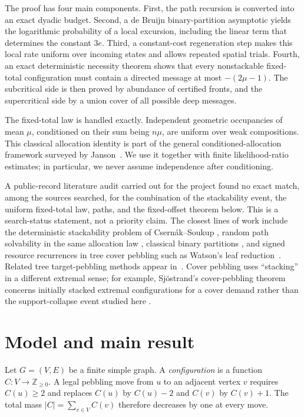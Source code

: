 \documentclass[11pt]{article}
\newcommand{\Z}{\mathbb Z}
\begin{document}
The proof has four main components.  First, the path recursion is converted
into an exact dyadic budget.  Second, a de Bruijn binary-partition asymptotic
\cite{deBruijn1948} yields the logarithmic probability of a local excursion,
including the linear term that determines the constant $3e$.  Third, a
constant-cost regeneration step makes this local rate uniform over incoming
states and allows repeated spatial trials.  Fourth, an exact deterministic
necessity theorem shows that every nonstackable fixed-total configuration must
contain a directed message at most $-(2\mu-1)$.  The subcritical side is then
proved by abundance of certified fronts, and the supercritical side by a union
cover of all possible deep messages.

The fixed-total law is handled exactly.  Independent geometric occupancies of
mean $\mu$, conditioned on their sum being $n\mu$, are uniform over weak
compositions.  This classical allocation identity is part of the general
conditioned-allocation framework surveyed by Janson~\cite{Janson2012}.  We use
it together with finite likelihood-ratio estimates; in particular, we never
assume independence after conditioning.

A public-record literature audit carried out for the project found no exact
match, among the sources searched, for the combination of the stackability
event, the uniform fixed-total law, paths, and the fixed-offset theorem below.
This is a search-status statement, not a priority claim.  The closest lines of
work include the deterministic stackability problem of Csern\'ak--Soukup
\cite{CsernakSoukup2026}, random path solvability in the same allocation law
\cite{Moews2019,BushawKettle2025}, classical binary partitions
\cite{Mahler1940,deBruijn1948}, and signed resource recurrences in tree cover
pebbling such as Watson's leaf reduction~\cite{Watson2005}.  Related tree
target-pebbling methods appear in~\cite{AdautoEtAl2026}.  Cover pebbling
uses ``stacking'' in a different extremal sense; for example, Sj\"ostrand's
cover-pebbling theorem concerns initially stacked extremal configurations for a
cover demand rather than the support-collapse event studied here
\cite{Sjoestrand2005}.

\section{Model and main result}\label{sec:model}

Let $G=(V,E)$ be a finite simple graph.  A \emph{configuration} is a function
$C:V\to\Z_{\ge0}$.  A legal pebbling move from $u$ to an adjacent vertex $v$
requires $C(u)\ge2$ and replaces $C(u)$ by $C(u)-2$ and $C(v)$ by $C(v)+1$.
The total mass $|C|=\sum_{v\in V}C(v)$ therefore decreases by one at every
move.
\end{document}
